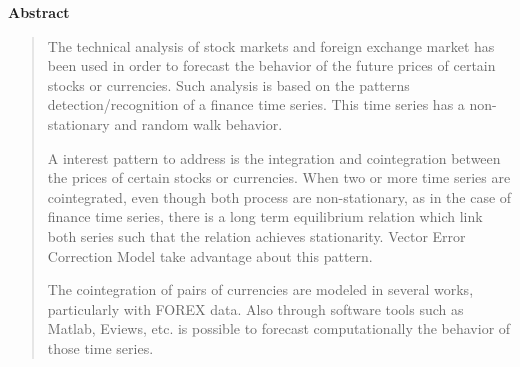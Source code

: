 \vspace*{2cm}
\thispagestyle{empty}
{\bfseries \Huge Abstract }
\vspace{1.5cm}

\begin{quotation}
The technical analysis of stock markets and foreign exchange market has been
used in order to forecast the behavior of the future prices of certain stocks
or currencies. Such analysis is based on the patterns detection/recognition of
a finance time series. This time series has a non-stationary and random walk
behavior.


A interest pattern to address is the integration and cointegration between
the prices of certain stocks or currencies. When two or more time series are
cointegrated, even though both process are non-stationary, as in the case
of finance time series, there is a long term equilibrium relation which link
both series such that the relation achieves stationarity. Vector Error
Correction Model take advantage about this pattern.


The cointegration of pairs of currencies are modeled in several works, particularly
with FOREX data. Also through software tools such as Matlab, Eviews, etc. is possible
to forecast computationally the behavior of those time series.



\end{quotation}
